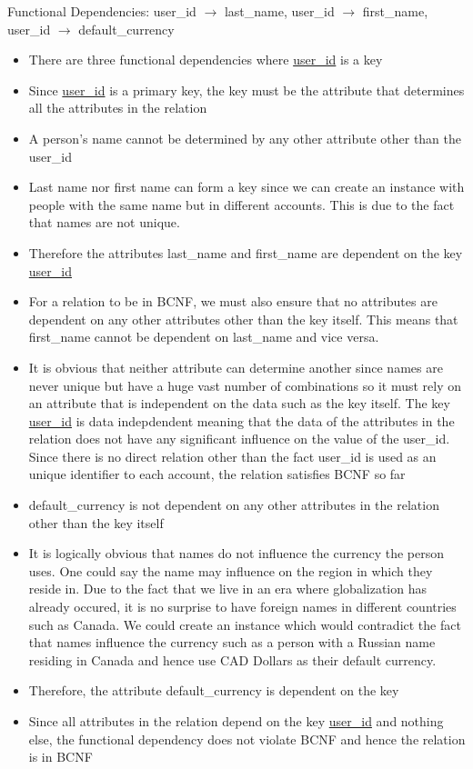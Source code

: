 \documentclass{article}
\begin{document}
Functional Dependencies: user\_id $\to$ last\_name, user\_id $\to$ first\_name, user\_id $\to$ default\_currency

\begin{itemize}
    \item There are three functional dependencies where \underline{user\_id} is a key
    \item Since \underline{user\_id} is a primary key, the key must be the attribute that determines all the attributes in the relation 
    \item A person's name cannot be determined by any other attribute other than the user\_id 
    \item Last name nor first name can form a key since we can create an instance with people with the same name but in different accounts. This is due to the fact that names are not unique.
    \item Therefore the attributes last\_name and first\_name are dependent on the key \underline{user\_id}
    \item For a relation to be in BCNF, we must also ensure that no attributes are dependent on any other attributes other than the key itself. This means that first\_name cannot be dependent on last\_name and vice versa. 
    \item It is obvious that neither attribute can determine another since names are never unique but have a huge vast number of combinations so it must rely on an attribute that is independent on the data such as the key itself. The key \underline{user\_id} is data indepdendent meaning that the data of the attributes in the relation does not have any significant influence on the value of the user\_id. Since there is no direct relation other than the fact user\_id is used as an unique identifier to each account, the relation satisfies BCNF so far
    \item default\_currency is not dependent on any other attributes in the relation other than the key itself
    \item It is logically obvious that names do not influence the currency the person uses. One could say the name may influence on the region in which they reside in. Due to the fact that we live in an era where globalization has already occured, it is no surprise to have foreign names in different countries such as Canada. We could create an instance which would contradict the fact that names influence the currency such as a person with a Russian name residing in Canada and hence use CAD Dollars as their default currency.
    \item Therefore, the attribute default\_currency is dependent on the key 
    \item Since all attributes in the relation depend on the key \underline{user\_id} and nothing else, the functional dependency does not violate BCNF and hence the relation is in BCNF
\end{itemize}
\end{document}
